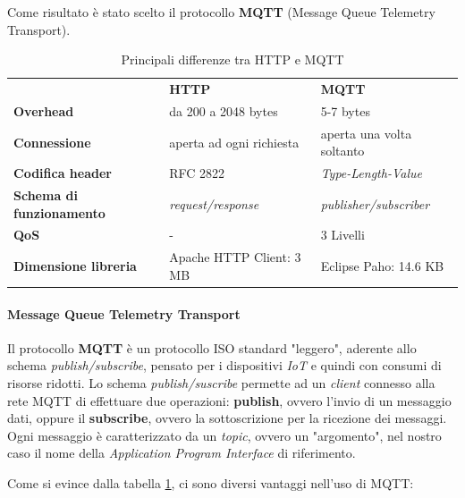 \documentclass[a4paper,10pt]{memoir}
\begin{document}
Come risultato è stato scelto il protocollo \textbf{MQTT} (Message Queue Telemetry Transport).


\begin{table}[h]
\centering
\caption{Principali differenze tra HTTP e MQTT}
\label{table:mqttdiff}
\begin{tabular}{lll}
                    & \textbf{HTTP} \cite{http} & \textbf{MQTT} \cite{mqtt} \\
\textbf{Overhead} & da 200 a 2048 bytes & 5-7 bytes \\
\textbf{Connessione} & aperta ad ogni richiesta & aperta una volta soltanto \\
\textbf{Codifica header} & RFC 2822 & \textit{Type-Length-Value} \\
\textbf{Schema di funzionamento} & \textit{request/response} & \textit{publisher/subscriber} \\
\textbf{QoS} & - & 3 Livelli \\
\textbf{Dimensione libreria} & Apache HTTP Client: 3 MB & Eclipse Paho: 14.6 KB \\
\end{tabular}
\end{table}

\paragraph{Message Queue Telemetry Transport} Il protocollo \textbf{MQTT} è un protocollo ISO standard "leggero", aderente allo schema \textit{publish/subscribe}, pensato per i dispositivi \textit{IoT} e quindi con consumi di risorse ridotti. Lo schema \textit{publish/suscribe} permette ad un \textit{client} connesso alla rete MQTT di effettuare due operazioni: \textbf{publish}, ovvero l'invio di un messaggio dati, oppure il \textbf{subscribe}, ovvero la sottoscrizione per la ricezione dei messaggi. Ogni messaggio è caratterizzato da un \textit{topic}, ovvero un "argomento", nel nostro caso il nome della \textit{Application Program Interface} di riferimento.

Come si evince dalla tabella \ref{table:mqttdiff}, ci sono diversi vantaggi nell'uso di MQTT:
\end{document}
